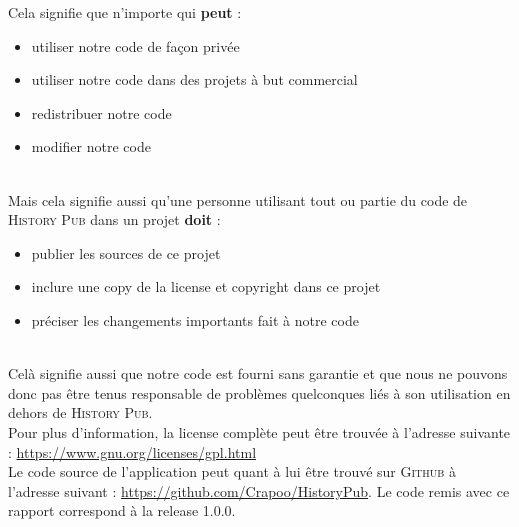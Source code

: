 \documentclass[11pt]{scrreprt}
\begin{document}
    \noindent Cela signifie que n'importe qui \textbf{peut} :
    \begin{itemize}
        \item utiliser notre code de façon privée
        \item utiliser notre code dans des projets à but commercial
        \item redistribuer notre code
        \item modifier notre code
    \end{itemize}
    \hfill\\
    Mais cela signifie aussi qu'une personne utilisant tout ou partie du code de \textsc{History Pub} dans un projet \textbf{doit} :
    \begin{itemize}
        \item publier les sources de ce projet
        \item inclure une copy de la license et copyright dans ce projet
        \item préciser les changements importants fait à notre code
    \end{itemize}
    \hfill\\
    Celà signifie aussi que notre code est fourni sans garantie et que nous ne pouvons donc pas être tenus responsable de problèmes quelconques liés à son utilisation en dehors de \textsc{History Pub}.
    \hfill\\

    \noindent Pour plus d'information, la license complète peut être trouvée à l'adresse suivante : \url{https://www.gnu.org/licenses/gpl.html}\\

    Le code source de l'application peut quant à lui être trouvé sur \textsc{Github} à l'adresse suivant : \url{https://github.com/Crapoo/HistoryPub}. Le code remis avec ce rapport correspond à la release 1.0.0.
\end{document}
